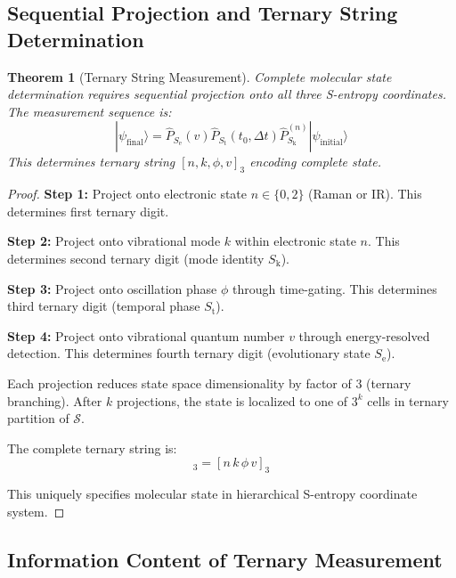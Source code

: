\documentclass[twocolumn,10pt]{article}
\newtheorem{theorem}{Theorem}[section]
\newcommand{\Sk}{S_{\text{k}}}
\newcommand{\St}{S_{\text{t}}}
\newcommand{\Se}{S_{\text{e}}}
\newcommand{\Sspace}{\mathcal{S}}
\begin{document}
\subsection{Sequential Projection and Ternary String Determination}

\begin{theorem}[Ternary String Measurement]
\label{thm:ternary_measurement}
Complete molecular state determination requires sequential projection onto all three S-entropy coordinates. The measurement sequence is:
\begin{equation}
|\psi_{\text{final}}\rangle = \hat{P}_{\Se}(v) \hat{P}_{\St}(t_0, \Delta t) \hat{P}_{\Sk}^{(n)} |\psi_{\text{initial}}\rangle
\end{equation}
This determines ternary string $[n, k, \phi, v]_3$ encoding complete state.
\end{theorem}

\begin{proof}
\textbf{Step 1:} Project onto electronic state $n \in \{0, 2\}$ (Raman or IR). This determines first ternary digit.

\textbf{Step 2:} Project onto vibrational mode $k$ within electronic state $n$. This determines second ternary digit (mode identity $\Sk$).

\textbf{Step 3:} Project onto oscillation phase $\phi$ through time-gating. This determines third ternary digit (temporal phase $\St$).

\textbf{Step 4:} Project onto vibrational quantum number $v$ through energy-resolved detection. This determines fourth ternary digit (evolutionary state $\Se$).

Each projection reduces state space dimensionality by factor of 3 (ternary branching). After $k$ projections, the state is localized to one of $3^k$ cells in ternary partition of $\Sspace$.

The complete ternary string is:
\begin{equation}
[t_1 \, t_2 \, t_3 \, t_4]_3 = [n \, k \, \phi \, v]_3
\end{equation}

This uniquely specifies molecular state in hierarchical S-entropy coordinate system.
\end{proof}

\subsection{Information Content of Ternary Measurement}
\end{document}

